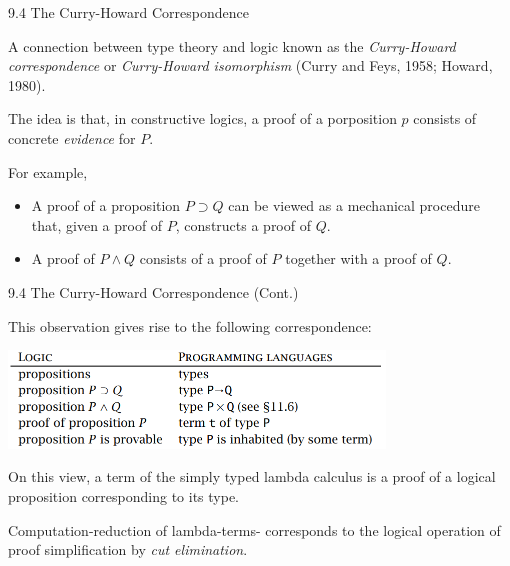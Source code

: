 \documentclass[table]{beamer}
\begin{document}
\begin{frame}[t]{9.4 The Curry-Howard Correspondence} \vspace{10pt}

A connection between type theory and logic known as the {\it Curry-Howard correspondence} or {\it Curry-Howard isomorphism} (Curry and Feys, 1958; Howard, 1980).

\vspace{10pt}

The idea is that, in constructive logics, a proof of a porposition $p$ consists of concrete {\it evidence} for $P$. 

\vspace{10pt}

For example,
\begin{itemize}
\item A proof of a proposition $P \supset Q$ can be viewed as a mechanical procedure that, given a proof of $P$, constructs a proof of $Q$.
\item A proof of $P \wedge Q$ consists of a proof of $P$ together with a proof of $Q$. 
\end{itemize}

\end{frame}

\begin{frame}[t]{9.4 The Curry-Howard Correspondence (Cont.)} \vspace{10pt}

This observation gives rise to the following correspondence:

 \vspace{10pt}

\includegraphics[width=10cm]{curryhowardisomorphism_ch9}

 \vspace{10pt}

On this view, a term of the simply typed lambda calculus is a proof of a logical proposition corresponding to its type. 

\vspace{10pt}

Computation-reduction of lambda-terms- corresponds to the logical operation of proof simplification by {\it cut elimination}. 

\end{frame}
\end{document}
